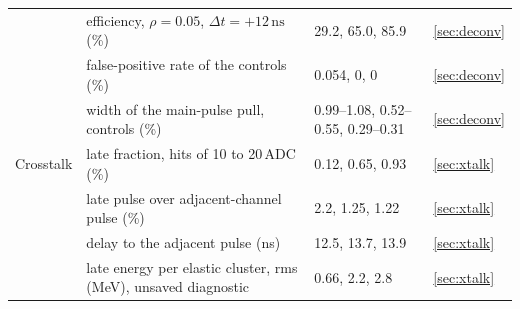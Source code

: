 \documentclass[11pt]{article}
\newcommand{\ns}{\,\mathrm{ns}}
\begin{document}
\begin{table}[htbp]
\begin{tabular}{p{}p{}p{}l}
 & efficiency, $\rho = 0.05$, $\Delta t = +12\ns$ (\%) & 29.2, 65.0, 85.9 & \ref{sec:deconv} \\
 & false-positive rate of the controls (\%) & 0.054, 0, 0 & \ref{sec:deconv} \\
 & width of the main-pulse pull, controls (\%) & 0.99--1.08, 0.52--0.55, 0.29--0.31 & \ref{sec:deconv} \\
\midrule
Crosstalk & late fraction, hits of 10 to 20\,ADC (\%) & 0.12, 0.65, 0.93 & \ref{sec:xtalk} \\
 & late pulse over adjacent-channel pulse (\%) & 2.2, 1.25, 1.22 & \ref{sec:xtalk} \\
 & delay to the adjacent pulse (ns) & 12.5, 13.7, 13.9 & \ref{sec:xtalk} \\
 & late energy per elastic cluster, rms (MeV), unsaved diagnostic & 0.66, 2.2, 2.8 & \ref{sec:xtalk} \\
\bottomrule
\end{tabular}
\end{table}
\end{document}
